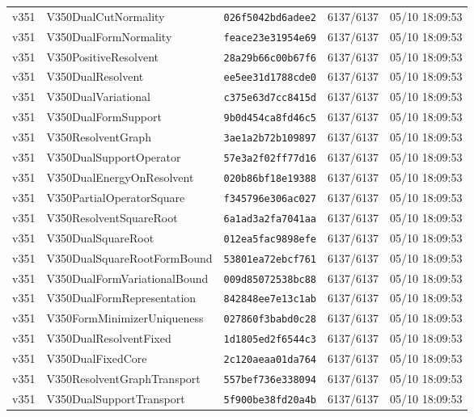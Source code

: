 \documentclass[11pt]{article}
\theoremstyle{definition}\newtheorem{deriv}{Derivação}
\begin{document}
{\begin{longtable}{@{}lllll@{}}
v351 & V350DualCutNormality & \texttt{026f5042bd6adee2} & 6137/6137 & 05/10 18:09:53 \\
v351 & V350DualFormNormality & \texttt{feace23e31954e69} & 6137/6137 & 05/10 18:09:53 \\
v351 & V350PositiveResolvent & \texttt{28a29b66c00b67f6} & 6137/6137 & 05/10 18:09:53 \\
v351 & V350DualResolvent & \texttt{ee5ee31d1788cde0} & 6137/6137 & 05/10 18:09:53 \\
v351 & V350DualVariational & \texttt{c375e63d7cc8415d} & 6137/6137 & 05/10 18:09:53 \\
v351 & V350DualFormSupport & \texttt{9b0d454ca8fd46c5} & 6137/6137 & 05/10 18:09:53 \\
v351 & V350ResolventGraph & \texttt{3ae1a2b72b109897} & 6137/6137 & 05/10 18:09:53 \\
v351 & V350DualSupportOperator & \texttt{57e3a2f02ff77d16} & 6137/6137 & 05/10 18:09:53 \\
v351 & V350DualEnergyOnResolvent & \texttt{020b86bf18e19388} & 6137/6137 & 05/10 18:09:53 \\
v351 & V350PartialOperatorSquare & \texttt{f345796e306ac027} & 6137/6137 & 05/10 18:09:53 \\
v351 & V350ResolventSquareRoot & \texttt{6a1ad3a2fa7041aa} & 6137/6137 & 05/10 18:09:53 \\
v351 & V350DualSquareRoot & \texttt{012ea5fac9898efe} & 6137/6137 & 05/10 18:09:53 \\
v351 & V350DualSquareRootFormBound & \texttt{53801ea72ebcf761} & 6137/6137 & 05/10 18:09:53 \\
v351 & V350DualFormVariationalBound & \texttt{009d85072538bc88} & 6137/6137 & 05/10 18:09:53 \\
v351 & V350DualFormRepresentation & \texttt{842848ee7e13c1ab} & 6137/6137 & 05/10 18:09:53 \\
v351 & V350FormMinimizerUniqueness & \texttt{027860f3babd0c28} & 6137/6137 & 05/10 18:09:53 \\
v351 & V350DualResolventFixed & \texttt{1d1805ed2f6544c3} & 6137/6137 & 05/10 18:09:53 \\
v351 & V350DualFixedCore & \texttt{2c120aeaa01da764} & 6137/6137 & 05/10 18:09:53 \\
v351 & V350ResolventGraphTransport & \texttt{557bef736e338094} & 6137/6137 & 05/10 18:09:53 \\
v351 & V350DualSupportTransport & \texttt{5f900be38fd20a4b} & 6137/6137 & 05/10 18:09:53 \\

\end{longtable}}
\end{document}
